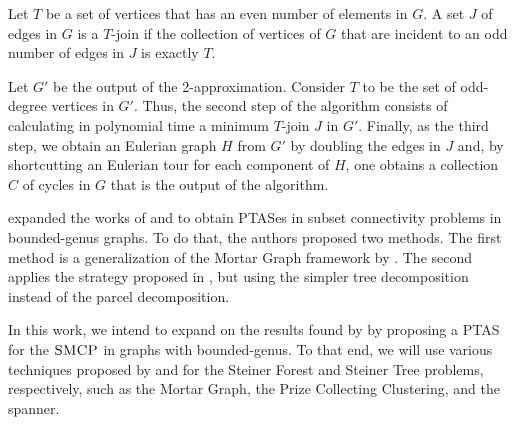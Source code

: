 Let \(T\) be a set of vertices that has an even number of elements in \(G\). A set \(J\) of edges in \(G\) is a \(T\)-join if the collection of vertices of \(G\) that are incident to an odd number of edges in \(J\) is exactly \(T\).

Let \(G'\) be the output of the 2-approximation. Consider \(T\) to be the set of odd-degree vertices in \(G'\). Thus, the second step of the algorithm consists of calculating in polynomial time a minimum \(T\)-join \(J\) in \(G'\). Finally, as the third step, we obtain an Eulerian graph \(H\) from \(G'\) by doubling the edges in \(J\) and, by shortcutting an Eulerian tour for each component of \(H\), one obtains a collection \(C\) of cycles in \(G\) that is the output of the algorithm.


\cite{Borradaile2012} expanded the works of \citeauthor{Borradaile2009b} and \citeauthor{KleinTSP} to obtain PTASes in subset connectivity problems in bounded-genus graphs. To do that, the authors proposed two methods. The first method is a generalization of the Mortar Graph framework by \cite{KleinTSP}. The second applies the strategy proposed in \cite{Borradaile2009b}, but using the simpler tree decomposition instead of the parcel decomposition.

In this work, we intend to expand on the results found by \cite{LINTZMAYER2020134} by proposing a PTAS for the \(\textsc{SMCP}\) in graphs with bounded-genus. To that end, we will use various techniques proposed by \cite{Bateni} and \cite{Borradaile2009b} for the Steiner Forest and Steiner Tree problems, respectively, such as the Mortar Graph, the Prize Collecting Clustering, and the spanner.
